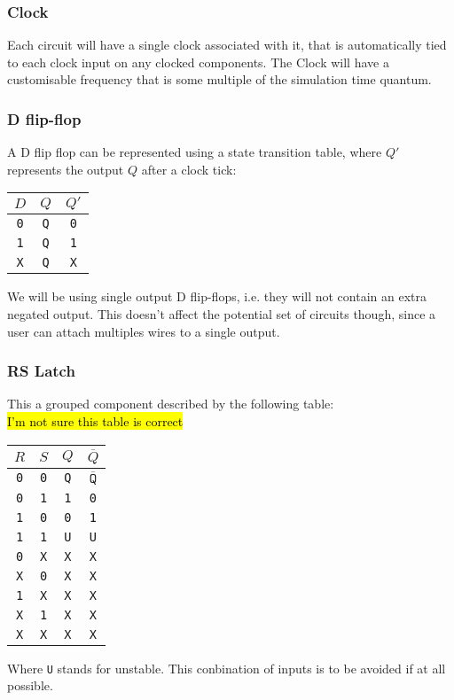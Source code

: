 \documentclass[12pt, a4paper, oneside,titlepage]{article}
\begin{document}
\subsubsection{Clock}
Each circuit will have a single clock associated with it, that is automatically tied to each clock input on any clocked components. The Clock will have a customisable frequency that is some multiple of the simulation time quantum. 
\subsubsection{D flip-flop}
A D flip flop can be represented using a state transition table, where $Q'$ represents the output $Q$ after a clock tick:

\begin{center}
\begin{tabular}{c |c | c}
$D$ & $Q$ & $Q'$\\
\hline
\texttt{0} & \texttt{Q} & \texttt{0}\\
\texttt{1} & \texttt{Q} & \texttt{1}\\
\texttt{X} & \texttt{Q} & \texttt{X}\\
\end{tabular}
\end{center}
We will be using single output D flip-flops, i.e. they will not contain an extra negated output. This doesn't affect the potential set of circuits though, since a user can attach multiples wires to a single output.
\subsubsection{RS Latch}
This a grouped component described by the following table: \\
\hl{I'm not sure this table is correct}
\begin{center}
\begin{tabular}{c |c | c | c}
$R$ & $S$ & $Q$ & $\overline{Q}$\\
\hline
\texttt{0} & \texttt{0} & \texttt{Q} & $\overline{\texttt{Q}}$\\
\texttt{0} & \texttt{1} & \texttt{1} & \texttt{0}\\
\texttt{1} & \texttt{0} & \texttt{0} & \texttt{1}\\
\texttt{1} & \texttt{1} & \texttt{U} & \texttt{U}\\
\texttt{0} & \texttt{X} & \texttt{X} & \texttt{X}\\
\texttt{X} & \texttt{0} & \texttt{X} & \texttt{X}\\
\texttt{1} & \texttt{X} & \texttt{X} & \texttt{X}\\
\texttt{X} & \texttt{1} & \texttt{X} & \texttt{X}\\
\texttt{X} & \texttt{X} & \texttt{X} & \texttt{X}\\
\end{tabular}
\end{center}
Where \texttt{U} stands for unstable. This conbination of inputs is to be avoided if at all possible.
\end{document}
